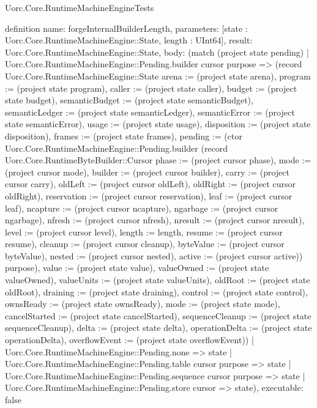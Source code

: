 \begin{lexlean}{Uorc.Core.RuntimeMachineEngineTests}
\begin{semanticmodule}
definition{
  name: forgeInternalBuilderLength,
  parameters: [state : Uorc.Core.RuntimeMachineEngine::State, length : UInt64],
  result: Uorc.Core.RuntimeMachineEngine::State,
  body: (match (project state pending)
    | Uorc.Core.RuntimeMachineEngine::Pending.builder cursor purpose => (record Uorc.Core.RuntimeMachineEngine::State {arena := (project state arena), program := (project state program), caller := (project state caller), budget := (project state budget), semanticBudget := (project state semanticBudget), semanticLedger := (project state semanticLedger), semanticError := (project state semanticError), usage := (project state usage), disposition := (project state disposition), frames := (project state frames), pending := (ctor Uorc.Core.RuntimeMachineEngine::Pending.builder (record Uorc.Core.RuntimeByteBuilder::Cursor {phase := (project cursor phase), mode := (project cursor mode), builder := (project cursor builder), carry := (project cursor carry), oldLeft := (project cursor oldLeft), oldRight := (project cursor oldRight), reservation := (project cursor reservation), leaf := (project cursor leaf), ncapture := (project cursor ncapture), ngarbage := (project cursor ngarbage), nfresh := (project cursor nfresh), nresult := (project cursor nresult), level := (project cursor level), length := length, resume := (project cursor resume), cleanup := (project cursor cleanup), byteValue := (project cursor byteValue), nested := (project cursor nested), active := (project cursor active)}) purpose), value := (project state value), valueOwned := (project state valueOwned), valueUnits := (project state valueUnits), oldRoot := (project state oldRoot), draining := (project state draining), control := (project state control), ownsReady := (project state ownsReady), mode := (project state mode), cancelStarted := (project state cancelStarted), sequenceCleanup := (project state sequenceCleanup), delta := (project state delta), operationDelta := (project state operationDelta), overflowEvent := (project state overflowEvent)})
    | Uorc.Core.RuntimeMachineEngine::Pending.none => state
    | Uorc.Core.RuntimeMachineEngine::Pending.table cursor purpose => state
    | Uorc.Core.RuntimeMachineEngine::Pending.sequence cursor purpose => state
    | Uorc.Core.RuntimeMachineEngine::Pending.store cursor => state),
  executable: false
}


\end{semanticmodule}
\end{lexlean}
